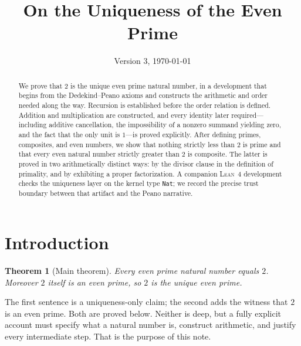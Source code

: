 \documentclass[11pt,reqno]{amsart}
\theoremstyle{plain}
\newtheorem{theorem}{Theorem}[section]
\theoremstyle{definition}
\theoremstyle{remark}
\numberwithin{equation}{section}
\begin{document}
\title[On the Uniqueness of the Even Prime]
{On the Uniqueness of the Even Prime}

\author{}
\address{}
\date{Version 3, \today}

\begin{abstract}
We prove that \(2\) is the unique even prime natural number, in a
development that begins from the Dedekind--Peano axioms and constructs
the arithmetic and order needed along the way. Recursion is established
before the order relation is defined. Addition and multiplication are
constructed, and every identity later required---including additive
cancellation, the impossibility of a nonzero summand yielding zero, and
the fact that the only unit is \(1\)---is proved explicitly. After
defining primes, composites, and even numbers, we show that nothing
strictly less than \(2\) is prime and that every even natural number
strictly greater than \(2\) is composite. The latter is proved in two
arithmetically distinct ways: by the divisor clause in the definition of
primality, and by exhibiting a proper factorization. A companion
\textsc{Lean}~4 development checks the uniqueness layer on the kernel
type \texttt{Nat}; we record the precise trust boundary between that
artifact and the Peano narrative.
\end{abstract}



\maketitle

\section{Introduction}
\label{sec:intro}

\begin{theorem}[Main theorem]
\label{thm:main}
Every even prime natural number equals \(2\). Moreover \(2\) itself is
an even prime, so \(2\) is the unique even prime.
\end{theorem}

The first sentence is a uniqueness-only claim; the second adds the
witness that \(2\) is an even prime. Both are proved below. Neither is
deep, but a fully explicit account must specify what a natural number
is, construct arithmetic, and justify every intermediate step. That is
the purpose of this note.
\end{document}
